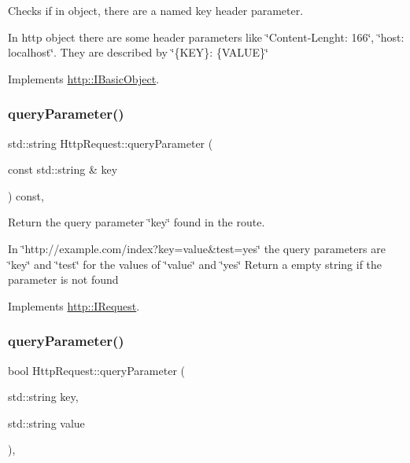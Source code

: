 Checks if in object, there are a named \textquotesingle{}key\textquotesingle{} header parameter. 

In http object there are some header parameters like \char`\"{}\+Content-\/\+Lenght\+: 166\char`\"{}, \char`\"{}host\+: localhost\char`\"{}. They are described by \char`\"{}\{\+K\+E\+Y\}\+: \{\+V\+A\+L\+U\+E\}\char`\"{} 

Implements \hyperlink{structhttp_1_1IBasicObject_a581e48c03a666b87082c75427f0ff835}{http\+::\+I\+Basic\+Object}.

\mbox{\label{classHttpRequest_a10cef7d5ff51ddc7eb5ebd2f25a0f66c}} 
\subsubsection{\texorpdfstring{query\+Parameter()}{queryParameter()}\hspace{0.1cm}{\footnotesize\ttfamily [1/2]}}
{\footnotesize\ttfamily std\+::string Http\+Request\+::query\+Parameter (\begin{DoxyParamCaption}\item[{const std\+::string \&}]{key }\end{DoxyParamCaption}) const\hspace{0.3cm}{\ttfamily [virtual]}, {\ttfamily [noexcept]}}



Return the query parameter \char`\"{}key\char`\"{} found in the route. 

In \char`\"{}http\+://example.\+com/index?key=value\&test=yes\char`\"{} the query parameters are \char`\"{}key\char`\"{} and \char`\"{}test\char`\"{} for the values of \char`\"{}value\char`\"{} and \char`\"{}yes\char`\"{} Return a empty string if the parameter is not found 

Implements \hyperlink{structhttp_1_1IRequest_ae6177a18241aff420fa2e6f93195a7a7}{http\+::\+I\+Request}.

\mbox{\label{classHttpRequest_a09bf36e9a2c76927ee45e6c5c699c461}} 
\subsubsection{\texorpdfstring{query\+Parameter()}{queryParameter()}\hspace{0.1cm}{\footnotesize\ttfamily [2/2]}}
{\footnotesize\ttfamily bool Http\+Request\+::query\+Parameter (\begin{DoxyParamCaption}\item[{std\+::string}]{key,  }\item[{std\+::string}]{value }\end{DoxyParamCaption})\hspace{0.3cm}{\ttfamily [virtual]}, {\ttfamily [noexcept]}}



